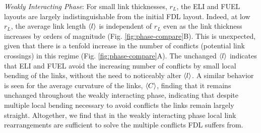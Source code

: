 \documentclass[nofootinbib,preprint,floatfix,titlepage,superscriptaddress]{revtex4} %
\begin{document}
{\em Weakly Interacting Phase}: For small link thicknesses, $r_L$, the ELI and FUEL layouts are largely indistinguishable from the initial FDL layout.
Indeed, at low $r_L$, the average link length $\left<l\right>$ is independent of $r_L$ even as the link thickness increases by orders of magnitude (Fig. \ref{fig:phase-compare}B).
This is unexpected, given that there is a tenfold increase in the number of  conflicts (potential link crossings) in this regime (Fig. \ref{fig:phase-compare}A). %
The unchanged $\left<l\right>$ indicates that ELI and FUEL avoid the increasing number of conflicts by small local bending of the links, without the need to noticeably alter $\left<l\right>$.
A similar behavior is seen for the average curvature of the links, $\left<C\right>$, finding that it remains unchanged throughout the weakly interacting phase, indicating that despite multiple local bending necessary to avoid conflicts the links remain largely straight. 
Altogether, we find that in the weakly interacting phase local link rearrangements are sufficient to solve the multiple conflicts FDL suffers from. 
\end{document}

